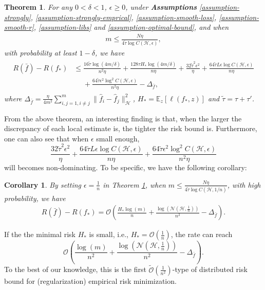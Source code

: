 \documentclass{article}
\newtheorem{theorem}{Theorem}
\newtheorem{corollary}{Corollary}
\begin{document}
\begin{theorem}
\label{theorem-main}
For any $0<\delta<1$, $\epsilon\geq 0$,
under \textbf{Assumptions}  \ref{assumption-strongly}, \ref{assumption-strongly-emprical},
\ref{assumption-smooth-loss}, \ref{assumption-smooth-r}, \ref{assumption-libs} and \ref{assumption-optimal-bound},
and when
  \begin{align}
    \label{equation-12}
    m\leq \frac{N\eta}{4\tilde{\tau}\log C(\mathcal{H},\epsilon)},
  \end{align}
  with probability at least $1-\delta$,
  we have
  \begin{align}
    \label{equation-13}
    \begin{aligned}
    R(\bar{f})-R(f_\ast)&\leq
    \frac{16\tilde{\tau} \log(4m/\delta)}{n^2\eta}+\frac{128\tau H_\ast\log(4m/\delta)}{n\eta}+\frac{32\tilde{\tau}^2\epsilon^2}{\eta}+
    \frac{64\tilde{\tau} L \epsilon \log C(\mathcal{H},\epsilon)}{n\eta}\\
   &~~~~~~+\frac{64\tilde{\tau} \epsilon^2 \log^2C(\mathcal{H},\epsilon)}{n^2\eta}
   -\Delta_{\bar{f}},
  \end{aligned}
  \end{align}
  where $\Delta_{\bar{f}}=\frac{\eta}{4m^2}\sum_{i,j=1,i\not=j}^m\|\hat{f}_i-\hat{f}_j\|_\mathcal{H}^2$, $H_\ast=\mathbb{E}_{z}\left[\ell(f_\ast,z)\right]$ and $\tilde{\tau}=\tau+\tau'$.
\end{theorem}
From the above theorem, an  interesting finding is that,
when the larger the discrepancy of each local estimate is,
the tighter the risk bound is.
Furthermore, one can also see that when $\epsilon$ small enough,
$$\frac{32\tilde{\tau}^2\epsilon^2}{\eta}+
    \frac{64\tilde{\tau} L \epsilon \log C(\mathcal{H},\epsilon)}{n\eta}
    +\frac{64\tilde{\tau} \epsilon^2\log^2C(\mathcal{H},\epsilon)}{n^2\eta}$$
will becomes non-dominating.
To be specific, we have the following corollary:
\begin{corollary}
\label{corollary-first}
  By setting $\epsilon=\frac{1}{n}$ in Theorem \ref{theorem-main},
  when $m\leq \frac{N\eta}{4\tilde{\tau}\log C(\mathcal{H},1/n)}$,
  with high probability,
  we have
  \begin{align*}
    R(\bar{f})-R(f_\ast)=\mathcal{O}\left(\frac{H_\ast\log(m)}{n}
    +\frac{\log(\mathcal{N}(\mathcal{H},\frac{1}{n}))}{n^2}
    -\Delta_{\bar{f}}\right).
  \end{align*}
\end{corollary}
If the the minimal risk $H_\ast$ is small, i.e., $H_\ast=\mathcal{O}(\frac{1}{n})$,
the rate can reach $$\mathcal{O}\left(\frac{\log(m)}{n^2}
    +\frac{\log(\mathcal{N}(\mathcal{H},\frac{1}{n}))}{n^2}
    -\Delta_{\bar{f}}\right).$$
To the best of our knowledge,
this is the first $\tilde{\mathcal{O}}\left(\frac{1}{n^2}\right)$-type of distributed
risk bound for (regularization) empirical risk minimization.
\end{document}
